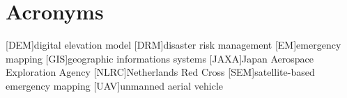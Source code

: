 \chapter*{Acronyms}

\begin{acronym}[UML]
  [DEM]{digital elevation model}
  [DRM]{disaster risk management}
  [EM]{emergency mapping}
  [GIS]{geographic informations systems}
  [JAXA]{Japan Aerospace Exploration Agency}
  [NLRC]{Netherlands Red Cross}
  [SEM]{satellite-based emergency mapping}
  [UAV]{unmanned aerial vehicle}
\end{acronym}